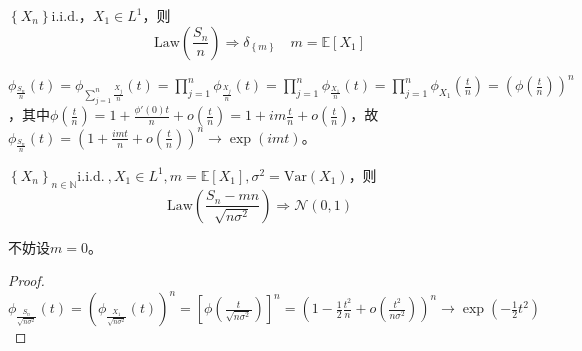 \documentclass{ctexart}
\begin{document}
\begin{Eg}[WLLN]
  $\left\{ X_n \right\} \mathrm{i.i.d.}$，$X_1\in L^1$，则
  \[\mathrm{Law}(\frac{S_n}{n})\Rightarrow \delta_{\left\{ m \right\}} \quad m=\mathbb{E}\left[ X_1 \right] \]

$\phi_{\frac{S_n}{n}}(t)=\phi_{\sum\limits_{j=1}^n \frac{X_j}{n}}(t)=\prod\limits_{j=1}^{n} \phi_{\frac{X_j}{n}}(t)= \prod\limits_{j=1}^n \phi_{\frac{X_1}{n}}(t)= \prod\limits_{j=1}^n \phi_{X_1}(\frac{t}{n})= (\phi(\frac{t}{n}))^{n}$，其中$\phi(\frac{t}{n})= 1+ \frac{\phi'(0)t}{n}+o(\frac{t}{n})= 1+im \frac{t}{n}+o(\frac{t}{n})$，故$\phi_{\frac{S_n}{n}}(t)=(1+\frac{imt}{n}+o(\frac{t}{n}))^n \to \exp(imt)$。
\end{Eg}

\begin{Eg}[$L^2$下的中心极限定理]
  $\left\{ X_n \right\}_{n\in \mathbb{N}} \mathrm{i.i.d.}~, X_1\in L^1, m=\mathbb{E}\left[ X_1 \right], \sigma^2=\mathrm{Var}(X_1) $，则
  \begin{equation*}
\mathrm{Law}(\frac{S_n-mn}{\sqrt{n\sigma^2}})\Rightarrow \mathcal{N}(0,1)
\end{equation*}

\begin{Rmk}
  不妨设$m=0$。
\end{Rmk}

\begin{proof}
  $\phi_{\frac{S_n}{\sqrt{n\sigma^2}}}(t) = (\phi_{\frac{X_1}{\sqrt{n\sigma^2}}}(t))^n= \left[ \phi(\frac{t}{\sqrt{n\sigma^2}}) \right]^n= (1 - \frac{1}{2}\frac{t^2}{n}+ o(\frac{t^2}{n\sigma^2}) )^n\to \exp(-\frac{1}{2}t^2)$
\end{proof}
\end{Eg}
\end{document}
